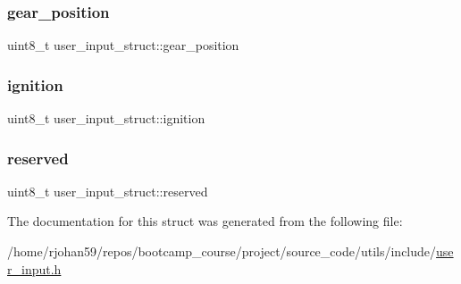 \subsubsection{\texorpdfstring{gear\+\_\+position}{gear\_position}}
{\footnotesize\ttfamily uint8\+\_\+t user\+\_\+input\+\_\+struct\+::gear\+\_\+position}

\mbox{\label{structuser__input__struct_aea05665db1f1373882f6e149a1b6d6cd}} 
\subsubsection{\texorpdfstring{ignition}{ignition}}
{\footnotesize\ttfamily uint8\+\_\+t user\+\_\+input\+\_\+struct\+::ignition}

\mbox{\label{structuser__input__struct_af96dd6051734c0bba913919a208d3d13}} 
\subsubsection{\texorpdfstring{reserved}{reserved}}
{\footnotesize\ttfamily uint8\+\_\+t user\+\_\+input\+\_\+struct\+::reserved}



The documentation for this struct was generated from the following file\+:\begin{DoxyCompactItemize}
\item 
/home/rjohan59/repos/bootcamp\+\_\+course/project/source\+\_\+code/utils/include/\hyperlink{user__input_8h}{user\+\_\+input.\+h}\end{DoxyCompactItemize}
